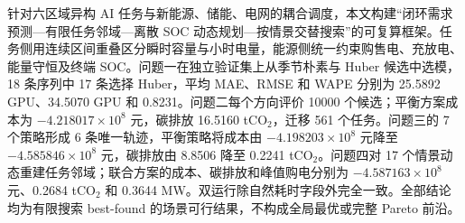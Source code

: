 针对六区域异构 AI 任务与新能源、储能、电网的耦合调度，本文构建“闭环需求预测—有限任务邻域—离散 SOC 动态规划—按情景交替搜索”的可复算框架。任务侧用连续区间重叠区分瞬时容量与小时电量，能源侧统一约束购售电、充放电、能量守恒及终端 SOC。问题一在独立验证集上从季节朴素与 Huber 候选中选模，18 条序列中 17 条选择 Huber，平均 MAE、RMSE 和 WAPE 分别为 25.5892 GPU、34.5070 GPU 和 0.8231。问题二每个方向评价 10000 个候选；平衡方案成本为 $-4.218017\times10^8$ 元，碳排放 16.5160 tCO$_2$，迁移 561 个任务。问题三的 7 个策略形成 6 条唯一轨迹，平衡策略将成本由 $-4.198203\times10^8$ 元降至 $-4.585846\times10^8$ 元，碳排放由 8.8506 降至 0.2241 tCO$_2$。问题四对 17 个情景动态重建任务邻域；联合方案的成本、碳排放和峰值购电分别为 $-4.587163\times10^8$ 元、0.2684 tCO$_2$ 和 0.3644 MW。双运行除自然耗时字段外完全一致。全部结论均为有限搜索 best-found 的场景可行结果，不构成全局最优或完整 Pareto 前沿。
